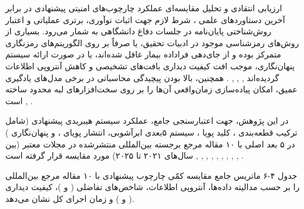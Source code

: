 

ارزیابی انتقادی و تحلیل مقایسه‌ای عملکرد چارچوب‌های امنیتی پیشنهادی در برابر آخرین دستاوردهای علمی ، شرط لازم جهت اثبات نوآوری، برتری عملیاتی و اعتبار روش‌شناختی پایان‌نامه در جلسات دفاع دانشگاهی به شمار می‌رود. بسیاری از روش‌های رمزشناسی موجود در ادبیات تحقیق، یا صرفاً بر روی الگوریتم‌های رمزنگاری متمرکز بوده و از جای‌دهی فراداده بیمار  غافل شده‌اند، یا در صورت ارائه سیستم پنهان‌نگاری، موجب افت کیفیت دیداری بافت‌های تشخیصی و کاهش آنتروپی اطلاعات گردیده‌اند , , , . همچنین، بالا بودن پیچیدگی محاسباتی در برخی مدل‌های یادگیری عمیق، امکان پیاده‌سازی زمان‌واقعی آن‌ها را بر روی سخت‌افزارهای لبه محدود ساخته است , .\par



در این پژوهش، جهت اعتبارسنجی جامع، عملکرد سیستم هیبریدی پیشنهادی (شامل ترکیب قطعه‌بندی ، کلید پویا ، سیستم ۵بعدی ابرآشوبی، انتشار پویای ، و پنهان‌نگاری ) در ۵ بعد اصلی با ۱۰ مقاله مرجع برجسته بین‌المللی منتشرشده در مجلات معتبر (بین سال‌های ۲۰۲۱ تا ۲۰۲۵) مورد مقایسه قرار گرفته است , , , , , , , , , .\par



جدول ۴{-}۶ ماتریس جامع مقایسه کمّی چارچوب پیشنهادی با ۱۰ مقاله مرجع بین‌المللی را بر حسب مدالیته داده‌ها، آنتروپی اطلاعات، شاخص‌های تفاضلی ( و )، کیفیت دیداری ( و ) و زمان اجرای کل نشان می‌دهد.\par



